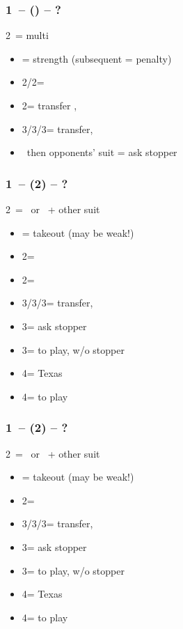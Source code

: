 \documentclass[12pt, a4paper]{report}
\begin{document}
{{{            \subsubsection*{1\ntx\ -- (\alrts{2\diams}) -- ?}
            2\diams\ = multi
            \begin{itemize}
                \item \dbl = strength (subsequent \dbl = penalty)
                \item 2\hearts/2\spades = \nat\ \nf
                \item 2\nt = transfer \clubs, \invp
                \item 3\clubs/3\diams/3\hearts = transfer, \invp
                \item \pass\ then opponents' suit = ask stopper
            \end{itemize}

            \subsubsection*{1\ntx\ -- (2\hearts) -- ?}
            2\hearts\ = \nat\ or \hearts\ + other suit
            \begin{itemize}
                \item \dbl = takeout (may be weak!)
                \item 2\spades = \nat
                \item 2\nt = \leb
                \item 3\clubs/3\hearts/3\spades = transfer, \invp
                \item 3\diams = ask stopper
                \item 3\nt = to play, w/o stopper
                \item 4\hearts = Texas
                \item 4\spades = to play
            \end{itemize}

            \subsubsection*{1\ntx\ -- (2\spades) -- ?}
            2\spades\ = \nat\ or \spades\ + other suit
            \begin{itemize}
                \item \dbl = takeout (may be weak!)
                \item 2\nt = \leb
                \item 3\clubs/3\diams/3\spades = transfer, \invp
                \item 3\hearts = ask stopper
                \item 3\nt = to play, w/o stopper
                \item 4\diams = Texas
                \item 4\hearts = to play
            \end{itemize}

}}}
\end{document}
